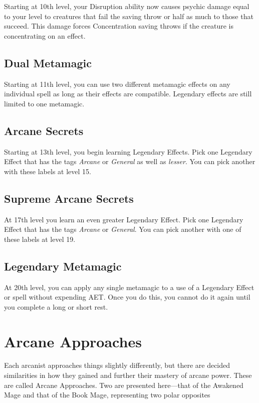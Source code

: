 Starting at 10th level, your Disruption ability now causes psychic damage equal to your level to creatures that fail the saving throw or half as much to those that succeed. This damage forces Concentration saving throws if the creature is concentrating on an effect.

\subsection{Dual Metamagic}

Starting at 11th level, you can use two different metamagic effects on any individual spell as long as their effects are compatible. Legendary effects are still limited to one metamagic.

\subsection{Arcane Secrets}
Starting at 13th level, you begin learning Legendary Effects. Pick one Legendary Effect that has the tags \textit{Arcane} or \textit{General} as well as \textit{lesser}. You can pick another with these labels at level 15.

\subsection{Supreme Arcane Secrets}
At 17th level you learn an even greater Legendary Effect. Pick one Legendary Effect that has the tags \textit{Arcane} or \textit{General}. You can pick another with one of these labels at level 19.

\subsection{Legendary Metamagic}
At 20th level, you can apply any single metamagic to a use of a Legendary Effect or spell without expending AET. Once you do this, you cannot do it again until you complete a long or short rest.

\section{Arcane Approaches}

Each arcanist approaches things slightly differently, but there are decided similarities in how they gained and further their mastery of arcane power. These are called Arcane Approaches. Two are presented here---that of the Awakened Mage and that of the Book Mage, representing two polar opposites

